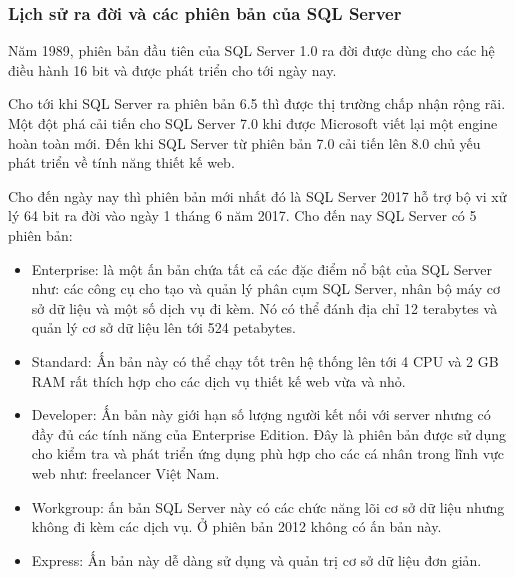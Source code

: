 \subsubsection{Lịch sử ra đời và các phiên bản của SQL Server}
Năm 1989, phiên bản đầu tiên của SQL Server 1.0 ra đời được dùng cho các hệ điều hành 16 bit và được phát triển cho tới ngày nay.
\par
Cho tới khi SQL Server ra phiên bản 6.5 thì được thị trường chấp nhận rộng rãi. Một đột phá cải tiến cho SQL Server 7.0 khi được Microsoft viết lại một engine hoàn toàn mới. Đến khi SQL Server từ phiên bản 7.0 cải tiến lên 8.0 chủ yếu phát triển về tính năng thiết kế web.
\par
Cho đến ngày nay thì phiên bản mới nhất đó là SQL Server 2017 hỗ trợ bộ vi xử lý 64 bit ra đời vào ngày 1 tháng 6 năm 2017. Cho đến nay SQL Server có 5 phiên bản:
\begin{itemize}
\item 	Enterprise: là một ấn bản chứa tất cả các đặc điểm nổ bật của SQL Server như: các công cụ cho tạo và quản lý phân cụm SQL Server, nhân bộ máy cơ sở dữ liệu và một số dịch vụ đi kèm. Nó có thể đánh địa chỉ 12 terabytes và quản lý cơ sở dữ liệu lên tới 524 petabytes.
\item 	Standard: Ấn bản này có thể chạy tốt trên hệ thống lên tới 4 CPU và 2 GB RAM rất thích hợp cho các dịch vụ thiết kế web vừa và nhỏ.
\item	Developer: Ấn bản này giới hạn số lượng người kết nối với server nhưng có đầy đủ các tính năng của Enterprise Edition. Đây là phiên bản được sử dụng cho kiểm tra và phát triển ứng dụng phù hợp cho các cá nhân trong lĩnh vực web như: freelancer Việt Nam.
\item	Workgroup: ấn bản SQL Server này có các chức năng lõi cơ sở dữ liệu nhưng không đi kèm các dịch vụ. Ở phiên bản 2012 không có ấn bản này.
\item	Express: Ấn bản này dễ dàng sử dụng và quản trị cơ sở dữ liệu đơn giản.
\end{itemize}
